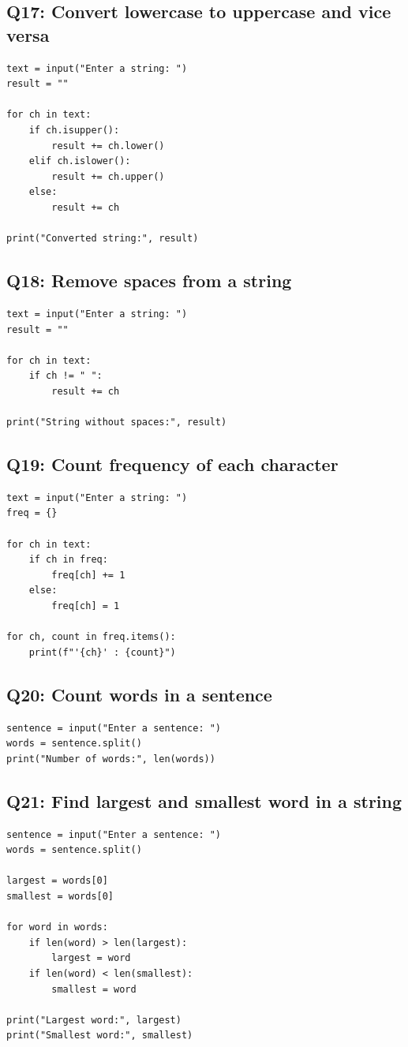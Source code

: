 \documentclass[11pt,a4paper]{article}
\begin{document}
\subsection{Q17: Convert lowercase to uppercase and vice versa}
\begin{lstlisting}
text = input("Enter a string: ")
result = ""

for ch in text:
    if ch.isupper():
        result += ch.lower()
    elif ch.islower():
        result += ch.upper()
    else:
        result += ch

print("Converted string:", result)
\end{lstlisting}

\subsection{Q18: Remove spaces from a string}
\begin{lstlisting}
text = input("Enter a string: ")
result = ""

for ch in text:
    if ch != " ":
        result += ch

print("String without spaces:", result)
\end{lstlisting}

\subsection{Q19: Count frequency of each character}
\begin{lstlisting}
text = input("Enter a string: ")
freq = {}

for ch in text:
    if ch in freq:
        freq[ch] += 1
    else:
        freq[ch] = 1

for ch, count in freq.items():
    print(f"'{ch}' : {count}")
\end{lstlisting}

\subsection{Q20: Count words in a sentence}
\begin{lstlisting}
sentence = input("Enter a sentence: ")
words = sentence.split()
print("Number of words:", len(words))
\end{lstlisting}

\subsection{Q21: Find largest and smallest word in a string}
\begin{lstlisting}
sentence = input("Enter a sentence: ")
words = sentence.split()

largest = words[0]
smallest = words[0]

for word in words:
    if len(word) > len(largest):
        largest = word
    if len(word) < len(smallest):
        smallest = word

print("Largest word:", largest)
print("Smallest word:", smallest)
\end{lstlisting}
\end{document}
